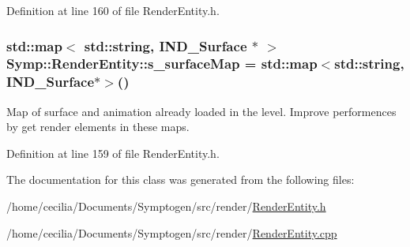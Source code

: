 Definition at line 160 of file Render\-Entity.\-h.

\hypertarget{class_symp_1_1_render_entity_a98acc72744a48bef45dcf4b0a9b0e8f7}{
\subsubsection[{s\-\_\-surface\-Map}]{\setlength{\rightskip}{0pt plus 5cm}std\-::map$<$ std\-::string, I\-N\-D\-\_\-\-Surface $\ast$ $>$ Symp\-::\-Render\-Entity\-::s\-\_\-surface\-Map = std\-::map$<$std\-::string, I\-N\-D\-\_\-\-Surface$\ast$$>$()\hspace{0.3cm}{\ttfamily [static]}}}\label{class_symp_1_1_render_entity_a98acc72744a48bef45dcf4b0a9b0e8f7}
Map of surface and animation already loaded in the level. Improve performences by get render elements in these maps. 

Definition at line 159 of file Render\-Entity.\-h.



The documentation for this class was generated from the following files\-:\begin{DoxyCompactItemize}
\item 
/home/cecilia/\-Documents/\-Symptogen/src/render/\hyperlink{_render_entity_8h}{Render\-Entity.\-h}\item 
/home/cecilia/\-Documents/\-Symptogen/src/render/\hyperlink{_render_entity_8cpp}{Render\-Entity.\-cpp}\end{DoxyCompactItemize}
